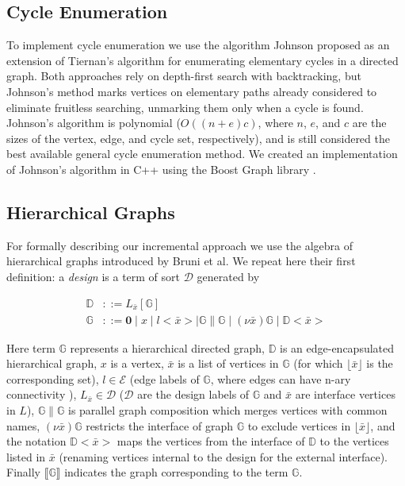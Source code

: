 \subsection{Cycle Enumeration}

To implement cycle enumeration we use the algorithm Johnson proposed as an 
extension of Tiernan's algorithm \cite{cycles:tiernan} for 
enumerating elementary cycles in a directed graph\cite{cycles:johnson75}.  Both
approaches rely on depth-first search with backtracking, but Johnson's method
marks vertices on elementary paths already considered to eliminate fruitless
searching, unmarking them only when a cycle is found.  Johnson's algorithm is 
polynomial ($O((n + e)c)$, where $n$, $e$, and $c$ are the sizes of the 
vertex, edge, and cycle set, respectively), and is still considered the best 
available general cycle enumeration method\cite{cycles:mateti76}.  We created
an implementation of Johnson's algorithm in C++ using the Boost Graph library
\cite{tools:boostgraph}.

\subsection{Hierarchical Graphs}

For formally describing our incremental approach we use the algebra of
hierarchical graphs introduced by Bruni et al\cite{graphs:hier_algebra}.
We repeat here their first definition: a \emph{design} is a term of
sort $\mathcal{D}$ generated by

\begin{align}
\label{eq:hiergraphs}
\mathbb{D} &::= L_{\bar{x}} [ \mathbb{G} ]  \\
\mathbb{G} &::= \mathbf{0} \mid x \mid l<\bar{x}> \mid \mathbb{G} \parallel \mathbb{G} \mid  (\nu \bar{x})\mathbb{G} \mid \mathbb{D} <\bar{x}>  \nonumber
\end{align}

Here term $\mathbb{G}$ represents a hierarchical directed graph, $\mathbb{D}$ 
is an edge-encapsulated hierarchical graph, $x$ is a vertex,
$\bar{x}$ is a list of vertices in $\mathbb{G}$ (for which 
$\lfloor \bar{x} \rfloor$ is the corresponding set), $l \in \mathcal{E}$ 
(edge labels of $\mathbb{G}$, where edges can have n-ary connectivity ), 
$L_{\bar{x}} \in \mathcal{D}$ ($\mathcal{D}$ are
the design labels of $\mathbb{G}$ and $\bar{x}$ 
are interface vertices in $L$),
$\mathbb{G} \parallel \mathbb{G}$ is parallel graph composition which merges 
vertices with common names, $(\nu \bar{x}) \mathbb{G}$ restricts the interface 
of graph $\mathbb{G}$ to exclude vertices in $\lfloor \bar{x} \rfloor$,
and the notation $\mathbb{D} <\bar{x}>$ maps the vertices from the 
interface of $\mathbb{D}$ to the vertices listed in $\bar{x}$ (renaming
vertices internal to the design for the external interface). Finally
$\llbracket \mathbb{G} \rrbracket$ indicates the graph corresponding
to the term $\mathbb{G}$.


